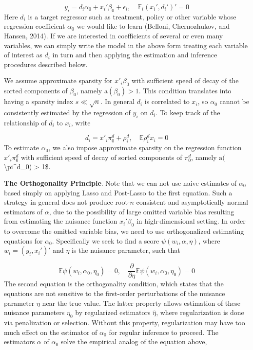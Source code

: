 \documentclass[12pt,a4paper]{article}
\begin{document}
\[
y_i = d_i \alpha_0 + x_i'\beta_0 + \epsilon_i, \quad \mathbb E_i\left(x_i', d_i'\right)' = 0 
\]
Here $d_i$ is a target regressor such as treatment, policy or other variable whose regression coefficient $\alpha_0$ we would like to learn (Belloni, Chernozhukov, and Hansen, 2014). If we are interested in coefficients of several or even many variables, we can simply write the model in the above form treating each variable of interest as $d_i$ in turn and then applying the estimation and inference procedures described below.

We assume approximate sparsity for $x'_i\beta_0$ with sufficient speed of decay of the sorted components of $\beta_0$, namely $\mathrm a(\beta_0) > 1$. This condition translates into having a sparsity index $s \ll \sqrt{n}$. In general $d_i$ is correlated to $x_i$, so $\alpha_0$ cannot be consistently estimated by the regression of $y_i$ on $d_i$. To keep track of the relationship of $d_i$ to $x_i$, write

\[
d_i = x'_i \pi_0^d + \rho_i^d, \quad \mathbb E\rho_i^dx_i = 0
\]
To estimate $\alpha _0$, we also impose approximate sparsity on the regression function $x'_i \pi_0^d$ with sufficient speed of decay of sorted components of $\pi_0^d$, namely $\mathrm a(${\textbackslash}pi\^{}d\_0) > 1\$.

\textbf{The Orthogonality Principle}.  Note that we can not use naive estimates of $\alpha_0$ based simply on applying Lasso and Post-Lasso to the first equation. Such a strategy in general does not produce root-$n$ consistent and asymptotically normal estimators of $\alpha$, due to the possibility of large omitted variable bias resulting from estimating the nuisance function $x_i'\beta_0$ in high-dimensional setting. In order to overcome the omitted variable bias, we need to use orthogonalized estimating equations for $\alpha_0$. Specifically we seek to find a score $\psi\left(w_i, \alpha, \eta\right)$, where $w_i = (y_i, x_i')'$ and $\eta$ is the nuisance parameter, such that

\[
\mathbb E \psi(w_i, \alpha_0, \eta_0) = 0, \quad \frac{\partial}{\partial \eta} \mathbb E \psi(w_i, \alpha_0, \eta_0) = 0
\]
The second equation is the orthogonality condition, which states that the equations are not sensitive to the first-order perturbations of the nuisance parameter $\eta$ near the true value. The latter property allows estimation of these nuisance parameters $\eta_0$ by regularized estimators $\hat{\eta}$, where regularization is done via penalization or selection. Without this property, regularization may have too much effect on the estimator of $\alpha_0$ for regular inference to proceed. The estimators $\alpha$ of $\alpha_0$ solve the empirical analog of the equation above,
\end{document}
